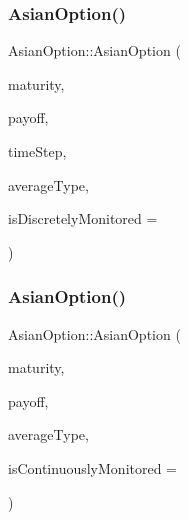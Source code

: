 \hypertarget{class_asian_option_a055f90a9d85eac93bac28cc9901489af}{}\label{class_asian_option_a055f90a9d85eac93bac28cc9901489af} 
\subsubsection{\texorpdfstring{Asian\+Option()}{AsianOption()}\hspace{0.1cm}{\footnotesize\ttfamily [2/3]}}
{\footnotesize\ttfamily Asian\+Option\+::\+Asian\+Option (\begin{DoxyParamCaption}\item[{\hyperlink{_name_def_8h_ac2d3e0ba793497bcca555c7c2cf64ff3}{Time}}]{maturity,  }\item[{std\+::shared\+\_\+ptr$<$ \hyperlink{class_payoff}{Payoff} $>$}]{payoff,  }\item[{\hyperlink{_name_def_8h_ac2d3e0ba793497bcca555c7c2cf64ff3}{Time}}]{time\+Step,  }\item[{\hyperlink{class_asian_option_add7292791bf85820ff9fdbfd4407f3b9}{Average\+Type}}]{average\+Type,  }\item[{bool}]{is\+Discretely\+Monitored = {} }\end{DoxyParamCaption})}

\hypertarget{class_asian_option_af6dc588a9183209493caf9eb7eb5e572}{}\label{class_asian_option_af6dc588a9183209493caf9eb7eb5e572} 
\subsubsection{\texorpdfstring{Asian\+Option()}{AsianOption()}\hspace{0.1cm}{\footnotesize\ttfamily [3/3]}}
{\footnotesize\ttfamily Asian\+Option\+::\+Asian\+Option (\begin{DoxyParamCaption}\item[{\hyperlink{_name_def_8h_ac2d3e0ba793497bcca555c7c2cf64ff3}{Time}}]{maturity,  }\item[{std\+::shared\+\_\+ptr$<$ \hyperlink{class_payoff}{Payoff} $>$}]{payoff,  }\item[{\hyperlink{class_asian_option_add7292791bf85820ff9fdbfd4407f3b9}{Average\+Type}}]{average\+Type,  }\item[{bool}]{is\+Continuously\+Monitored = {} }\end{DoxyParamCaption})}




